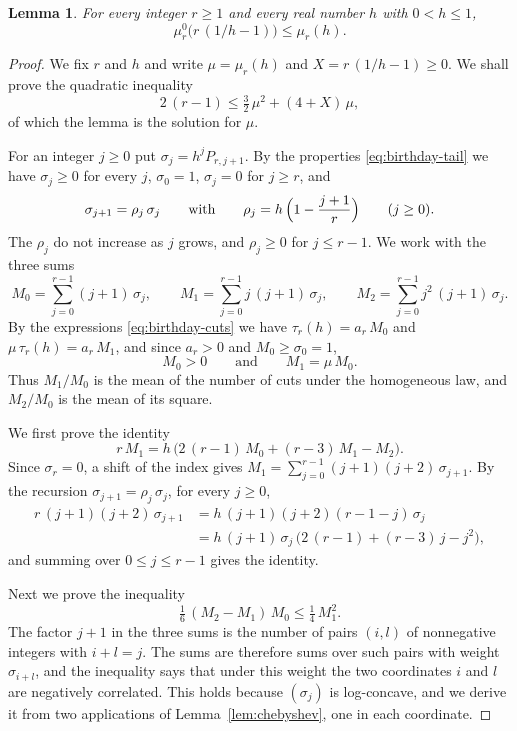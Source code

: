 \documentclass{amsart}
\newtheorem{lemma}[theorem]{Lemma}
\theoremstyle{definition}
\theoremstyle{remark}
\numberwithin{equation}{section}
\begin{document}
\begin{lemma}\label{lem:meancuts}
For every integer $r\ge 1$ and every real number $h$ with $0<h\le 1$,
\[
\mu^0_r\bigl(r\,(1/h-1)\bigr)\le\mu_r(h).
\]
\end{lemma}

\begin{proof}
We fix $r$ and $h$ and write $\mu=\mu_r(h)$ and $X=r\,(1/h-1)\ge 0$. We shall prove the quadratic inequality
\[
2\,(r-1)\le\tfrac32\,\mu^2+(4+X)\,\mu,
\]
of which the lemma is the solution for $\mu$.

For an integer $j\ge 0$ put $\sigma_j=h^{j}P_{r,j+1}$. By the properties \eqref{eq:birthday-tail} we have $\sigma_j\ge 0$ for every $j$, $\sigma_0=1$, $\sigma_j=0$ for $j\ge r$, and
\[
\sigma_{j+1}=\rho_j\,\sigma_j\qquad\text{with}\qquad\rho_j=h\,\Bigl(1-\frac{j+1}{r}\Bigr)\qquad(j\ge 0).
\]
The $\rho_j$ do not increase as $j$ grows, and $\rho_j\ge 0$ for $j\le r-1$. We work with the three sums
\[
M_0=\sum_{j=0}^{r-1}(j+1)\,\sigma_j,\qquad M_1=\sum_{j=0}^{r-1}j\,(j+1)\,\sigma_j,\qquad M_2=\sum_{j=0}^{r-1}j^2\,(j+1)\,\sigma_j.
\]
By the expressions \eqref{eq:birthday-cuts} we have $\tau_r(h)=a_r\,M_0$ and $\mu\,\tau_r(h)=a_r\,M_1$, and since $a_r>0$ and $M_0\ge\sigma_0=1$,
\[
M_0>0\qquad\text{and}\qquad M_1=\mu\,M_0.
\]
Thus $M_1/M_0$ is the mean of the number of cuts under the homogeneous law, and $M_2/M_0$ is the mean of its square.

We first prove the identity
\[
r\,M_1=h\,\bigl(2\,(r-1)\,M_0+(r-3)\,M_1-M_2\bigr).
\]
Since $\sigma_r=0$, a shift of the index gives $M_1=\sum_{j=0}^{r-1}(j+1)(j+2)\,\sigma_{j+1}$. By the recursion $\sigma_{j+1}=\rho_j\,\sigma_j$, for every $j\ge 0$,
\begin{align*}
r\,(j+1)(j+2)\,\sigma_{j+1}&=h\,(j+1)(j+2)(r-1-j)\,\sigma_j\\
&=h\,(j+1)\,\sigma_j\,\bigl(2\,(r-1)+(r-3)\,j-j^2\bigr),
\end{align*}
and summing over $0\le j\le r-1$ gives the identity.

Next we prove the inequality
\[
\tfrac16\,(M_2-M_1)\,M_0\le\tfrac14\,M_1^2.
\]
The factor $j+1$ in the three sums is the number of pairs $(i,l)$ of nonnegative integers with $i+l=j$. The sums are therefore sums over such pairs with weight $\sigma_{i+l}$, and the inequality says that under this weight the two coordinates $i$ and $l$ are negatively correlated. This holds because $(\sigma_j)$ is log-concave, and we derive it from two applications of Lemma~\ref{lem:chebyshev}, one in each coordinate.


\end{proof}
\end{document}
